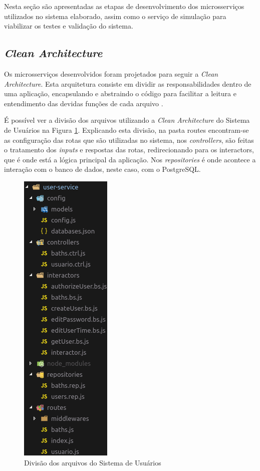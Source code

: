 Nesta seção são apresentadas as etapas de desenvolvimento dos microsserviços utilizados no sistema elaborado, assim como o serviço de simulação para viabilizar os testes e validação do sistema.

\subsection{\textit{Clean Architecture}}

Os microsserviços desenvolvidos foram projetados para seguir a \textit{Clean Architecture}. Esta arquitetura consiste em dividir as responsabilidades dentro de uma aplicação, encapsulando e abstraindo o código para facilitar a leitura e entendimento das devidas funções de cada arquivo \cite{martin2000clean}.

É possível ver a divisão dos arquivos utilizando a \textit{Clean Architecture} do Sistema de Usuários na Figura \ref{fig:clean}. Explicando esta divisão, na pasta routes encontram-se as configuração das rotas que são utilizadas no sistema, nos \textit{controllers}, são feitas o tratamento dos \textit{inputs} e respostas das rotas, redirecionando para os interactors, que é onde está a lógica principal da aplicação. Nos \textit{repositories} é onde acontece a interação com o banco de dados, neste caso, com o PostgreSQL.

\begin{figure}[htbp]
	\centering
	\includegraphics[width=0.22\linewidth]{figuras/cleanarch.png}
	\caption{Divisão dos arquivos do Sistema de Usuários}
	\label{fig:clean}
\end{figure}



